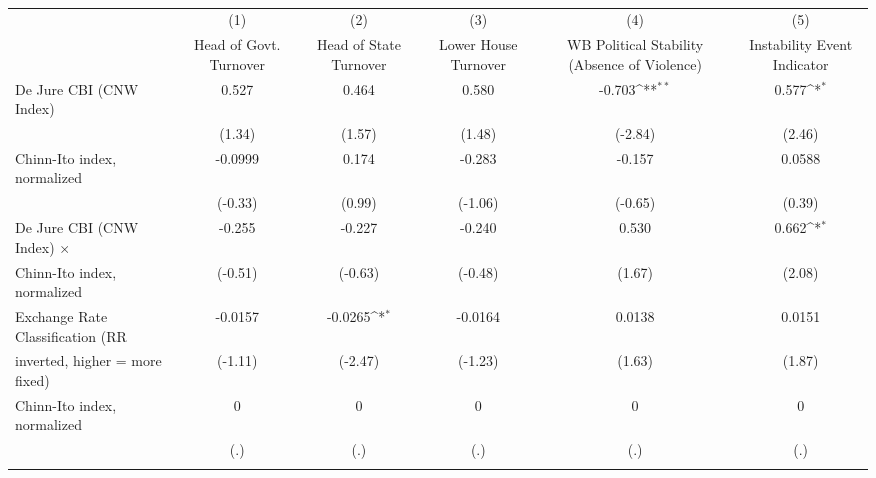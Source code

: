 \begin{table}[htbp]\centering
\def\sym#1{\ifmmode^{#1}\else\(^{#1}\)\fi}
\caption{\label{ikmultIndFEDJ}}
\begin{tabular}{l*{5}{c}}
\toprule
                                        &\multicolumn{1}{c}{(1)}&\multicolumn{1}{c}{(2)}&\multicolumn{1}{c}{(3)}&\multicolumn{1}{c}{(4)}&\multicolumn{1}{c}{(5)}\\
                                        &\multicolumn{1}{c}{Head of Govt. Turnover}&\multicolumn{1}{c}{Head of State Turnover}&\multicolumn{1}{c}{Lower House Turnover}&\multicolumn{1}{c}{WB Political Stability (Absence of Violence)}&\multicolumn{1}{c}{Instability Event Indicator}\\
\midrule
De Jure CBI (CNW Index)                 &    0.527         &    0.464         &    0.580         &   -0.703\sym{**} &    0.577\sym{*}  \\
                                        &   (1.34)         &   (1.57)         &   (1.48)         &  (-2.84)         &   (2.46)         \\
\addlinespace
Chinn-Ito index, normalized             &  -0.0999         &    0.174         &   -0.283         &   -0.157         &   0.0588         \\
                                        &  (-0.33)         &   (0.99)         &  (-1.06)         &  (-0.65)         &   (0.39)         \\
\addlinespace
De Jure CBI (CNW Index) $\times$        &   -0.255         &   -0.227         &   -0.240         &    0.530         &    0.662\sym{*}  \\
Chinn-Ito index, normalized             &  (-0.51)         &  (-0.63)         &  (-0.48)         &   (1.67)         &   (2.08)         \\
\addlinespace
Exchange Rate Classification (RR        &  -0.0157         &  -0.0265\sym{*}  &  -0.0164         &   0.0138         &   0.0151         \\
inverted, higher = more fixed)          &  (-1.11)         &  (-2.47)         &  (-1.23)         &   (1.63)         &   (1.87)         \\
\addlinespace
Chinn-Ito index, normalized             &        0         &        0         &        0         &        0         &        0         \\
                                        &      (.)         &      (.)         &      (.)         &      (.)         &      (.)         \\
\addlinespace

\end{tabular}
\end{table}
